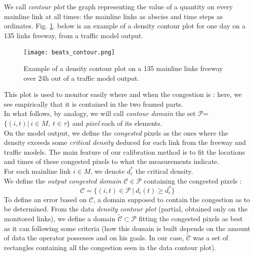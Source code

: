 We call \emph{contour plot} the graph representing the value of a quantity on every mainline link at all times: the mainline links as absciss and time steps as ordinates.
Fig. \ref{fig:beats_contour}. below is an example of a density contour plot for one day on a 135 links freeway, from a traffic model output.\\
\begin{figure}[h!]
	\caption{Example of a density contour plot on a 135 mainline links freeway over 24h out of a traffic model output.}
	\centering
	\label{fig:beats_contour}
	\texttt{[image: beats\_contour.png]}
\end{figure}
This plot is used to monitor easily where and when the congestion is : here, we see empirically that it is contained in the two framed parts.\\
In what follows, by analogy, we will call \emph{contour domain} the set $\mathscr{P}$=$\big\{(i,t)|\ i\in M,\ t\in\tau\big\}$ and \emph{pixel} each of its elements.\\
On the model output, we define the \emph{congested} pixels as the ones where the density exceeds some \emph{critical density} deduced for each link from the freeway and traffic models. The main feature of our calibration method is to fit the locations and times of these congested pixels to what the measurements indicate.\\
For each mainline link $i\in{M}$, we denote $d_{i}^{*}$ the critical density.
\\
We define the \emph{output congested domain} $\mathscr{C}\in\mathscr{P}$ containing the congested pixels :
\begin{equation*}
	\mathscr{C}=\big\{ (i,t)\in{\mathscr{P}}\ |\ {d_{i}(t) \geq d_{i}^{*}}\big\}
\end{equation*}
To define an error based on $\mathscr{C}$, a domain supposed to contain the congestion as to be determined.
From the data \emph{density contour plot} (partial, obtained only on the monitored links), we define a domain $\widetilde{\mathscr{C}}\subset\mathscr{P}$ fitting the congested pixels as best as it can following some criteria (how this domain is built depends on the amount of data the operator possesses and on his goals. In our case, $\widetilde{\mathscr{C}}$ was a set of rectangles containing all the congestion seen in the data contour plot).\\
